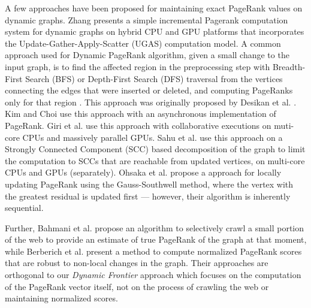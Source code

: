 A few approaches have been proposed for maintaining exact PageRank values on dynamic graphs. Zhang \cite{rank-zhang17} presents a simple incremental Pagerank computation system for dynamic graphs on hybrid CPU and GPU platforms that incorporates the Update-Gather-Apply-Scatter (UGAS) computation model. A common approach used for Dynamic PageRank algorithm, given a small change to the input graph, is to find the affected region in the preprocessing step with Breadth-First Search (BFS) or Depth-First Search (DFS) traversal from the vertices connecting the edges that were inserted or deleted, and computing PageRanks only for that region \cite{rank-desikan05, kim2015incremental, rank-giri20, sahu2022dynamic}. This approach was originally proposed by Desikan et al. \cite{rank-desikan05}. Kim and Choi \cite{kim2015incremental} use this approach with an asynchronous implementation of PageRank. Giri et al. use this approach with collaborative executions on muti-core CPUs and massively parallel GPUs. Sahu et al. \cite{sahu2022dynamic} use this approach on a Strongly Connected Component (SCC) based decomposition of the graph to limit the computation to SCCs that are reachable from updated vertices, on multi-core CPUs and GPUs (separately). Ohsaka et al. \cite{ohsaka2015efficient} propose a approach for locally updating PageRank using the Gauss-Southwell method, where the vertex with the greatest residual is updated first --- however, their algorithm is inherently sequential. 


Further, Bahmani et al. \cite{rank-bahmani12} propose an algorithm to selectively crawl a small portion of the web to provide an estimate of true PageRank of the graph at that moment, while Berberich et al. \cite{rank-berberich07} present a method to compute normalized PageRank scores that are robust to non-local changes in the graph. Their approaches are orthogonal to our \textit{Dynamic Frontier} approach which focuses on the computation of the PageRank vector itself, not on the process of crawling the web or maintaining normalized scores.

